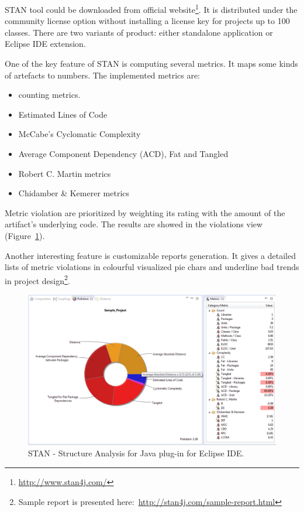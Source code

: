 STAN tool could be downloaded from official website\footnote{\url{http://www.stan4j.com/}}. It is distributed under the community license option without installing a license key for projects up to 100 classes. There are two variants of product: either standalone application or Eclipse IDE extension.

One of the key feature of STAN is computing several metrics. It maps some kinds of artefacts to numbers. The implemented metrics are:

\begin{itemize}
\item counting metrics.
\item Estimated Lines of Code
\item McCabe's Cyclomatic Complexity
\item Average Component Dependency (ACD), Fat and Tangled
\item Robert C. Martin metrics
\item Chidamber \& Kemerer metrics
\end{itemize}

Metric violation are prioritized  by weighting its rating with the amount of the artifact's underlying code. The results are showed in the violations view (Figure~\ref{fig:stan}).

Another interesting feature is customizable reports generation. It gives a detailed lists of metric violations in colourful visualized pie chars and underline bad trends in project design\footnote{Sample report is presented here:~\url{http://stan4j.com/sample-report.html}}\cite{stan}.

\begin{figure}[h!]
	\centering
	\includegraphics[scale=0.55]{img/stan.png} 
	\caption{STAN - Structure Analysis for Java plug-in for Eclipse IDE.}		
	\label{fig:stan}
\end{figure}



